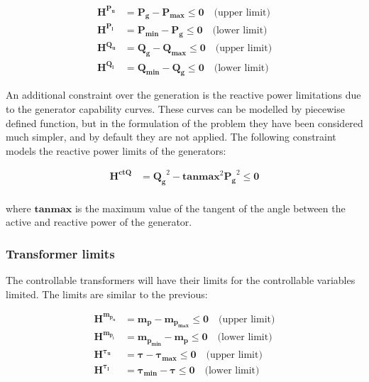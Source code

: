\begin{equation}
    \begin{split}
    \bm{H^{P_{u}}} &= \bm{P_g} - \bm{P_{max}} \leq \bm{0} \quad \text{(upper limit)}\\
    \bm{H^{P_{l}}} &= \bm{P_{min}} - \bm{P_g} \leq \bm{0} \quad \text{(lower limit)}\\
    \bm{H^{Q_{u}}} &= \bm{Q_g} - \bm{Q_{max}} \leq \bm{0} \quad \text{(upper limit)}\\
    \bm{H^{Q_{l}}} &= \bm{Q_{min}} - \bm{Q_g} \leq \bm{0} \quad \text{(lower limit)}
    \end{split}
\end{equation}

An additional constraint over the generation is the reactive power limitations due to the generator capability curves. These curves can be modelled by piecewise defined function, 
but in the formulation of the problem they have been considered much simpler, and by default they are not applied. The following constraint models the reactive power limits of the generators:

\begin{equation}
    \begin{split}
    \bm{H^{ctQ}} &= \bm{Q_g}^2 - \bm{tanmax}^2 \bm{P_{g}}^2 \leq \bm{0}\\
    \end{split}
\end{equation}

where $\bm{tanmax}$ is the maximum value of the tangent of the angle between the active and reactive power of the generator.

\subsubsection{Transformer limits}

The controllable transformers will have their limits for the controllable variables limited. The limits are similar to the previous:

\begin{equation}
    \begin{split}
    \bm{H^{m_{p_{u}}}} &= \bm{m_{p}} - \bm{m_{p_{max}}} \leq \bm{0} \quad \text{(upper limit)}\\
    \bm{H^{m_{p_{l}}}} &= \bm{m_{p_{min}}} - \bm{m_{p}} \leq \bm{0} \quad \text{(lower limit)}\\
    \bm{H^{\tau_{u}}} &= \bm{\tau} - \bm{\tau_{max}} \leq \bm{0} \quad \text{(upper limit)}\\
    \bm{H^{\tau_{l}}} &= \bm{\tau_{min}} - \bm{\tau} \leq \bm{0} \quad \text{(lower limit)}
    \end{split}
\end{equation}

